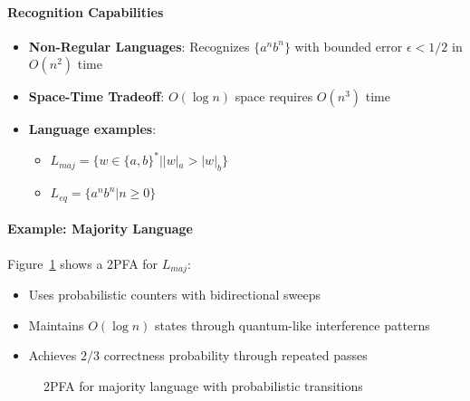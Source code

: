 \paragraph{Recognition Capabilities}
\begin{itemize}
    \item \textbf{Non-Regular Languages}: Recognizes \( \{a^n b^n\} \) with bounded error \( \epsilon < 1/2 \) in \( O(n^2) \) time \cite{freivalds1981probabilistic}
    \item \textbf{Space-Time Tradeoff}: \( O(\log n) \) space requires \( O(n^3) \) time \cite{papadimitriou1994computational}
    \item \textbf{Language examples}:
        \begin{itemize}
            \item \( L_{maj} = \{w \in \{a,b\}^* | |w|_a > |w|_b\} \)
            \item \( L_{eq} = \{a^n b^n | n \geq 0\} \)
        \end{itemize}
\end{itemize}

\paragraph{Example: Majority Language}
Figure~\ref{fig:2pfa-example} shows a 2PFA for \( L_{maj} \):
\begin{itemize}
    \item Uses probabilistic counters with bidirectional sweeps
    \item Maintains \( O(\log n) \) states through quantum-like interference patterns
    \item Achieves \( 2/3 \) correctness probability through repeated passes
\end{itemize}

\begin{figure}[h]
    \centering  
    \caption{2PFA for majority language with probabilistic transitions}
    \label{fig:2pfa-example}
\end{figure}

